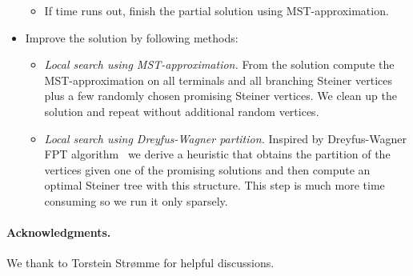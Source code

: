 \documentclass[review,a4paper]{article}
\begin{document}
\begin{itemize}
\begin{itemize}
    \item If time runs out, finish the partial solution using MST-approximation.
  \end{itemize}
\item Improve the solution by following methods:
  \begin{itemize}
    \item \emph{Local search using MST-approximation.} From the solution compute the MST-approximation on all terminals and all branching Steiner vertices plus a few randomly chosen promising Steiner vertices. We clean up the solution and repeat without additional random vertices.
    \item \emph{Local search using Dreyfus-Wagner partition.} Inspired by Dreyfus-Wagner FPT algorithm~\cite{DW} we derive a heuristic that obtains the partition of the vertices given one of the promising solutions and then compute an optimal Steiner tree with this structure. This step is much more time consuming so we run it only sparsely.
    \end{itemize}
\end{itemize}

\paragraph{Acknowledgments.}
We thank to Torstein Strømme for helpful discussions.




\end{document}
